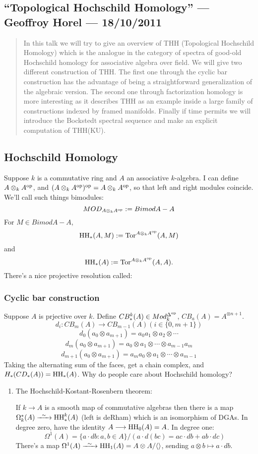 \documentclass[11pt]{article}
\newcommand{\KanSemResponse}[1]
{
\thispagestyle{fancy}
\subsection*{#1}
}
\begin{document}
\begin{GeoffroyTopologicalHochschildHomology}
\newcommand{\THH}{\textup{THH}}
\newcommand{\HH}{\textup{HH}}
\KanSemResponse
{``Topological Hochschild Homology'' --- Geoffroy Horel --- 18/10/2011}
\begin{abstract}
In this talk we will try to give an overview of THH
(Topological Hochschild Homology) which is the analogue in the category of
spectra of good-old Hochschild homology for associative algebra over field.
We will give two different construction of THH. The first one through the
cyclic bar construction has the advantage of being a straightforward
generalization of the algebraic version. The second one through
factorization homology is more interesting as it describes THH as an
example inside a large family of constructions indexed by framed manifolds.
Finally if time permits we will introduce the Bockstedt spectral sequence
and make an explicit computation of THH(KU).
\end{abstract}
\subsection*{Hochschild Homology}
Suppose $k$ is a commutative ring and $A$ an associative $k$-algebra. I can define $A\otimes_k A^{\textup{op}}$, and $(A\otimes_k A^{\textup{op}})^{\textup{op}}=A\otimes_k A^{\textup{op}}$, so that left and right modules coincide. We'll call such things bimodules:
\[MOD_{A\otimes_k A^{\textup{op}}}:=Bimod{A-A}\]
For $M\in Bimod{A-A}$, 
\[\HH_*(A,M):=\Tor^{A\otimes_k A^\op}(A,M)\]
and 
\[\HH_*(A):=\Tor^{A\otimes_k A^\op}(A,A).\]
There's a nice projective resolution called:
\subsubsection*{Cyclic bar construction}
Suppose $A$ is prjective over $k$. Define $CB_*^k(A)\in Mod_k^{\Delta^{\textup{op}}}$, $CB_a(A)=A^{\otimes n+1}$.
\[d_i:CB_m(A)\to CB_{m-1}(A) (i\in\{0,m+1\})\]
\[d_0(a_0\otimes a_{m+1})=a_0a_1\otimes a_2\otimes\cdots\]
\[d_m(a_0\otimes a_{m+1})=a_0\otimes a_1\otimes\cdots\otimes a_{m-1}a_{m}\]
\[d_{m+1}(a_0\otimes a_{m+1})=a_ma_0\otimes a_1\otimes\cdots\otimes a_{m-1}\]
Taking the alternating sum of the faces, get a chain complex, and
$H_*(CD_*(A))=\HH_*(A)$.
Why do people care about Hochschild homology?
\begin{enumerate}
\item The Hochschild-Kostant-Rosenbern theorem:
\begin{thm*}
If $k\to A$ is a smooth map of commutative algebras then there is a map $\Omega_k^*(A)\weakequiv \HH_*^k(A)$ (left is deRham) which is an isomorphism of DGAs. In degree zero, have the identity $A\to\HH_0(A)=A$. In degree one:
\[\Omega^1(A)=\{a\cdot db:a,b\in A\}/(a\cdot d(bc)=ac\cdot db+ab\cdot dc)\]
There's a map $\Omega^1(A)\weakequiv\HH_1(A)=A\otimes A/\langle\rangle$, sending $a\otimes b\mapsto a\cdot db$.


\end{thm*}
\end{enumerate}
\end{GeoffroyTopologicalHochschildHomology}
\end{document}
